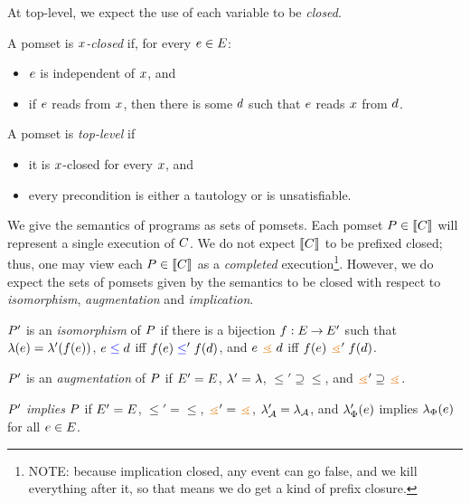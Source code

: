 At top-level, we expect the use of each variable to be \emph{closed}.
\begin{definition}
\label{def:x-closed}
  A pomset is \emph{$x$-closed} if, for every $e\in E$:
  \begin{itemize}
  \item $e$ is independent of $x$, and
  \item if $e$ reads from $x$, then there is some $d$ such that
    $e$ reads $x$ from $d$.
  \end{itemize}
  A pomset is \emph{top-level} if
  \begin{itemize}
  \item it is $x$-closed for every $x$, and
  \item every precondition is either a tautology or is unsatisfiable.
  \end{itemize}
\end{definition}

We give the semantics of programs as sets of pomsets.  Each pomset
$P\in\llbracket C\rrbracket$ will represent a single execution of $C$.  We do not
expect $\llbracket C\rrbracket$ to be prefixed closed; thus, one may view each
$P\in\llbracket C\rrbracket$ as a \emph{completed} execution\footnote{NOTE: because
  implication closed, any event can go false, and we kill everything after
  it, so that means we do get a kind of prefix closure.}.  However, we do
expect the sets of pomsets given by the semantics to be closed with respect
to \emph{isomorphism}, \emph{augmentation} and \emph{implication}.
\begin{definition}
  $P'$ is an \emph{isomorphism} of $P$ if there is a bijection
  $f:E\mathbin\rightarrow E'$ such that $\lambda(e)=\lambda'(f(e))$,
  $e\mathrel{{\color{blue}\leq}}d$ iff $f(e)\mathrel{{\color{blue}\leq}}'f(d)$, and $\aEv\gtN\bEv$ iff
  $f(\aEv)\gtN'f(\bEv)$.

  $P'$ is an \emph{augmentation} of $P$ if $E'=E$,
  ${\lambda'}={\lambda}$, ${\le'}\supseteq{\le}$, and
  ${\gtN'}\supseteq{\gtN}$.

  $P'$ \emph{implies} $P$ if $E'=E$, ${\le'}={\le}$,
  ${\gtN'}={\gtN}$, $\lambda_{\mathcal{A}}'=\lambda_{\mathcal{A}}$, and $\lambda_{\Phi}'(e)$
  implies $\lambda_{\Phi}(e)$ for all $e\in E$.
\end{definition}


